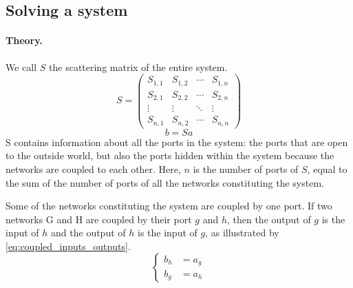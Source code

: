 \subsection{Solving a system}

\paragraph{Theory.}

We call $S$ the scattering matrix of the entire system.
\begin{equation*}
    S =
    \begin{pmatrix}
        S_{1, 1} & S_{1, 2} & \cdots & S_{1, n} \\
        S_{2, 1} & S_{2, 2} & \cdots & S_{2, n} \\
        \vdots   & \vdots   & \ddots & \vdots \\
        S_{n, 1} & S_{n, 2} & \cdots & S_{n, n}
    \end{pmatrix}
\end{equation*}
\begin{equation*}
    b = Sa
\end{equation*}
S contains information about all the ports in the system: the ports that are open to the outside world, but also the ports hidden within the system because the networks are coupled to each other.
Here, $n$ is the number of ports of $S$, equal to the sum of the number of ports of all the networks constituting the system.

Some of the networks constituting the system are coupled by one port.
If two networks G and H are coupled by their port $g$ and $h$, then the output of $g$ is the input of $h$ and the output of $h$ is the input of $g$, as illustrated by \cref{eq:coupled_inputs_outputs}.
\begin{equation}
    \left\lbrace
    \begin{aligned}
        b_h &= a_g \\
        b_g &= a_h
    \end{aligned}
    \right.
    \label{eq:coupled_inputs_outputs}
\end{equation}

